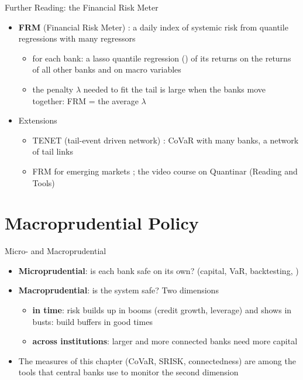 \begin{frame}{Further Reading: the Financial Risk Meter}
\itemsize{\small}
\begin{itemize}
    \item \textbf{FRM} (Financial Risk Meter) : a daily index of systemic risk from quantile regressions with many regressors
    \begin{itemize}
        \item for each bank: a lasso quantile regression () of its returns on the returns of all other banks and on macro variables
        \item the penalty $\lambda$ needed to fit the tail is large when the banks move together: FRM = the average $\lambda$
    \end{itemize}
    \item Extensions
    \begin{itemize}
        \item TENET (tail-event driven network) : CoVaR with many banks, a network of tail links
        \item FRM for emerging markets ; the video course on Quantinar (Reading and Tools)
    \end{itemize}
\end{itemize}
\end{frame}


\section{Macroprudential Policy}

\begin{frame}{Micro- and Macroprudential}
\itemsize{\small}
\begin{itemize}
    \item \textbf{Microprudential}: is each bank safe on its own? (capital, VaR, backtesting, )
    \item \textbf{Macroprudential}: is the system safe? Two dimensions
    \begin{itemize}
        \item \textbf{in time}: risk builds up in booms (credit growth, leverage) and shows in busts: build buffers in good times
        \item \textbf{across institutions}: larger and more connected banks need more capital
    \end{itemize}
    \item The measures of this chapter (CoVaR, SRISK, connectedness) are among the tools that central banks use to monitor the second dimension
\end{itemize}
\end{frame}

